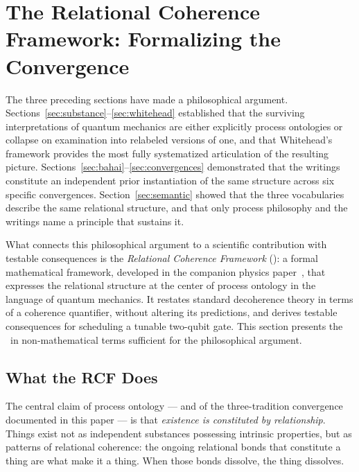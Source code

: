 
\section{The Relational Coherence Framework: Formalizing the Convergence}
\label{sec:rcf-phil}

The three preceding sections have made a philosophical argument.
Sections~\ref{sec:substance}--\ref{sec:whitehead} established that the
surviving interpretations of quantum mechanics are either explicitly
process ontologies or collapse on examination into relabeled versions
of one, and that Whitehead's framework provides the most fully
systematized articulation of the resulting picture.
Sections~\ref{sec:bahai}--\ref{sec:convergences} demonstrated that the \bahai
writings constitute an independent prior instantiation of the same structure
across six specific convergences.
Section~\ref{sec:semantic} showed that the three vocabularies describe the
same relational structure, and that only process philosophy and the \bahai
writings name a principle that sustains it.

What connects this philosophical argument to a scientific contribution
with testable consequences is the \emph{Relational Coherence Framework} (\RCF):
a formal mathematical framework, developed in the companion physics
paper~\citep{Adams2026Physics}, that expresses the relational structure at
the center of process ontology in the language of quantum mechanics.
It restates standard decoherence theory in terms of a coherence
quantifier, without altering its predictions, and derives testable
consequences for scheduling a tunable two-qubit gate.
This section presents the \RCF\ in non-mathematical terms sufficient for
the philosophical argument.

\subsection{What the RCF Does}

The central claim of process ontology --- and of the three-tradition
convergence documented in this paper --- is that \emph{existence is
constituted by relationship}.
Things exist not as independent substances possessing intrinsic properties,
but as patterns of relational coherence: the ongoing relational bonds
that constitute a thing are what make it a thing.
When those bonds dissolve, the thing dissolves.

